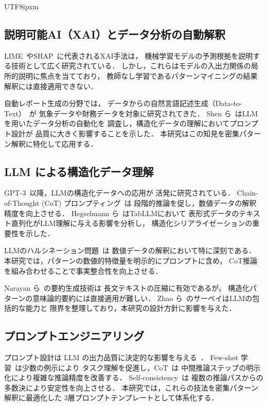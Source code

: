 \documentclass[conference]{IEEEtran}
\begin{document}
\begin{CJK}{UTF8}{ipxm}
\subsection{説明可能AI（XAI）とデータ分析の自動解釈}

LIME~\cite{ribeiro2016lime}やSHAP~\cite{lundberg2017shap}に代表されるXAI手法は，
機械学習モデルの予測根拠を説明する技術として広く研究されている．
しかし，これらはモデルの入出力関係の局所的説明に焦点を当てており，
教師なし学習であるパターンマイニングの結果解釈には直接適用できない．

自動レポート生成の分野では，
データからの自然言語記述生成（Data-to-Text）~\cite{reiter2007architecture}が
気象データや財務データを対象に研究されてきた．
Shen ら~\cite{shen2023data}はLLMを用いたデータ分析の自動化を
調査し，構造化データの理解においてプロンプト設計が
品質に大きく影響することを示した．
本研究はこの知見を密集パターン解釈に特化して応用する．

\subsection{LLM による構造化データ理解}

GPT-3~\cite{brown2020gpt3}以降，LLMの構造化データへの応用が
活発に研究されている．
Chain-of-Thought (CoT) プロンプティング~\cite{wei2022chain}は
段階的推論を促し，数値データの解釈精度を向上させる．
Hegselmann ら~\cite{hegselmann2023tabllm}はTabLLMにおいて
表形式データのテキスト直列化がLLM理解に与える影響を分析し，
構造化シリアライゼーションの重要性を示した．

LLMのハルシネーション問題~\cite{ji2023hallucination}は
数値データの解釈において特に深刻である．
本研究では，パターンの数値的特徴量を明示的にプロンプトに含め，
CoT推論を組み合わせることで事実整合性を向上させる．

Narayan ら~\cite{narayan2018dont}の要約生成技術は
長文テキストの圧縮に有効であるが，
構造化パターンの意味論的要約には直接適用が難しい．
Zhao ら~\cite{zhao2023survey}のサーベイはLLMの包括的な能力と
限界を整理しており，本研究の設計方針に影響を与えた．

\subsection{プロンプトエンジニアリング}

プロンプト設計は LLM の出力品質に決定的な影響を与える~\cite{liu2023summary}．
Few-shot 学習~\cite{brown2020gpt3}は少数の例示により
タスク理解を促進し，CoT~\cite{wei2022chain}は
中間推論ステップの明示化により複雑な推論精度を改善する．
Self-consistency~\cite{wang2023selfconsistency}は
複数の推論パスからの多数決により安定性を向上させる．
本研究では，これらの技法を密集パターン解釈に最適化した
3層プロンプトテンプレートとして体系化する．


\end{CJK}
\end{document}
